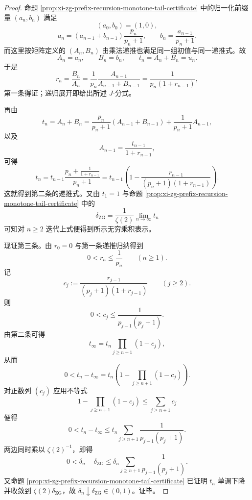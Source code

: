 \begin{proof}
命题 \ref{prop:xi-zg-prefix-recursion-monotone-tail-certificate} 中的归一化前缀量 \((a_n,b_n)\) 满足
\[
(a_0,b_0)=(1,0),
\]
\[
a_n=(a_{n-1}+b_{n-1})\frac{p_n}{p_n+1},
\qquad
b_n=\frac{a_{n-1}}{p_n+1}.
\]
而这里按矩阵定义的 \((A_n,B_n)\) 由乘法递推也满足同一组初值与同一递推式。故
\[
A_n=a_n,
\qquad
B_n=b_n,
\qquad
t_n=A_n+B_n=u_n.
\]
于是
\[
r_n=\frac{B_n}{A_n}
=
\frac{1}{p_n}\frac{A_{n-1}}{A_{n-1}+B_{n-1}}
=
\frac{1}{p_n(1+r_{n-1})},
\]
第一条得证；递归展开即给出所述 \(J\)-分式。

再由
\[
t_n=A_n+B_n
=
\frac{p_n}{p_n+1}(A_{n-1}+B_{n-1})
+\frac{1}{p_n+1}A_{n-1},
\]
以及
\[
A_{n-1}=\frac{t_{n-1}}{1+r_{n-1}},
\]
可得
\[
t_n
=
t_{n-1}\frac{p_n+\frac{1}{1+r_{n-1}}}{p_n+1}
=
t_{n-1}\left(1-\frac{r_{n-1}}{(p_n+1)(1+r_{n-1})}\right).
\]
这就得到第二条的递推式。又由 \(t_1=1\) 与命题
\ref{prop:xi-zg-prefix-recursion-monotone-tail-certificate}
中的
\[
\delta_{\mathrm{ZG}}=\frac{1}{\zeta(2)}\lim_{n\to\infty}t_n
\]
可知对 \(n\ge 2\) 迭代上式便得到所示无穷乘积表示。

现证第三条。由 \(r_0=0\) 与第一条递推归纳得到
\[
0<r_n\le \frac1{p_n}\qquad (n\ge 1).
\]
记
\[
c_j:=\frac{r_{j-1}}{(p_j+1)(1+r_{j-1})}\qquad (j\ge 2).
\]
则
\[
0<c_j\le \frac{1}{p_{j-1}(p_j+1)}.
\]
由第二条可得
\[
t_\infty
=
t_n\prod_{j\ge n+1}(1-c_j),
\]
从而
\[
0<t_n-t_\infty
=
t_n\left(1-\prod_{j\ge n+1}(1-c_j)\right).
\]
对正数列 \((c_j)\) 应用不等式
\[
1-\prod_{j\ge n+1}(1-c_j)\le \sum_{j\ge n+1}c_j
\]
便得
\[
0<t_n-t_\infty
\le
t_n\sum_{j\ge n+1}\frac{1}{p_{j-1}(p_j+1)}.
\]
两边同时乘以 \(\zeta(2)^{-1}\)，即得
\[
0<\delta_n-\delta_{\mathrm{ZG}}
\le
\delta_n\sum_{j\ge n+1}\frac{1}{p_{j-1}(p_j+1)}.
\]
又命题 \ref{prop:xi-zg-prefix-recursion-monotone-tail-certificate} 已证明 \(t_n\) 单调下降并收敛到 \(\zeta(2)\delta_{\mathrm{ZG}}\)，故 \(\delta_n\downarrow \delta_{\mathrm{ZG}}\in(0,1)\)。证毕。
\end{proof}

